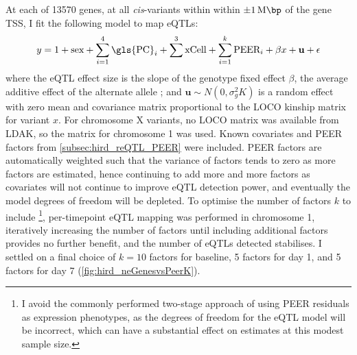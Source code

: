 At each of \num{13570} genes, at all \textit{cis}-variants within within $\pm \SI{1}{\mega\bp}$ of the gene \gls{TSS}, I fit the following model to map \glspl{eQTL}:
\begin{equation}
    \begin{split}
        y = 1 + \text{sex} + \sum_{i=1}^{4}{\text{\gls{PC}}_i} + \sum_{}^{3}{\text{xCell}} + \sum_{i=1}^{k}{\text{PEER}_i} + \beta x + \mathbf{u} + \epsilon
    \end{split}
    \label{eq:hird_reQTL_limix_model}
\end{equation}
where the \gls{eQTL} effect size is the slope of the genotype fixed effect $\beta$, the average additive effect of the alternate allele \autocite{visscher2019Fisher1918Paper};
and $\mathbf{u} \sim N(0, \sigma_g^2 K)$ is a random effect with zero mean and covariance matrix proportional to the \gls{LOCO} kinship matrix for variant $x$.
For chromosome X variants, no \gls{LOCO} matrix was available from LDAK, so the matrix for chromosome 1 was used.
%
Known covariates and PEER factors from \cref{subsec:hird_reQTL_PEER} were included.
PEER factors are automatically weighted such that the variance of factors tends to zero as more factors are estimated, 
hence continuing to add more and more factors as covariates will not continue to improve \gls{eQTL} detection power, and eventually the model degrees of freedom will be depleted.
To optimise the number of factors $k$ to include%
\footnote{I avoid the commonly performed two-stage approach of using PEER residuals as expression phenotypes, as the degrees of freedom for the \gls{eQTL} model will be incorrect, which can have a substantial effect on estimates at this modest sample size.}, 
per-timepoint \gls{eQTL} mapping was performed in chromosome 1, iteratively increasing the number of factors until including additional factors provides no further benefit, and the number of \glspl{eQTL} detected stabilises.
I settled on a final choice of $k=10$ factors for baseline, 5 factors for day 1, and 5 factors for day 7 (\cref{fig:hird_neGenesvsPeerK}).

